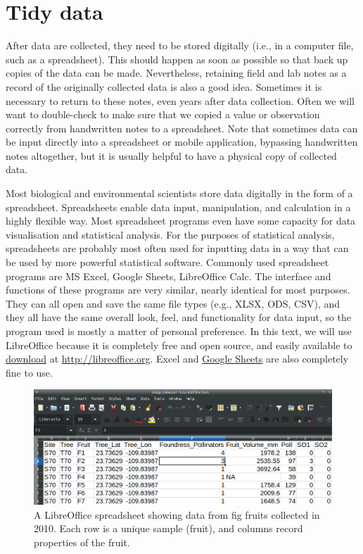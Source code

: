 \documentclass[
]{scrbook}
\begin{document}
\hypertarget{tidy-data}{%
\section{Tidy data}\label{tidy-data}}

After data are collected, they need to be stored digitally (i.e., in a computer file, such as a spreadsheet).
This should happen as soon as possible so that back up copies of the data can be made.
Nevertheless, retaining field and lab notes as a record of the originally collected data is also a good idea.
Sometimes it is necessary to return to these notes, even years after data collection.
Often we will want to double-check to make sure that we copied a value or observation correctly from handwritten notes to a spreadsheet.
Note that sometimes data can be input directly into a spreadsheet or mobile application, bypassing handwritten notes altogether, but it is usually helpful to have a physical copy of collected data.

Most biological and environmental scientists store data digitally in the form of a spreadsheet.
Spreadsheets enable data input, manipulation, and calculation in a highly flexible way.
Most spreadsheet programs even have some capacity for data visualisation and statistical analysis.
For the purposes of statistical analysis, spreadsheets are probably most often used for inputting data in a way that can be used by more powerful statistical software.
Commonly used spreadsheet programs are MS Excel, Google Sheets, LibreOffice Calc.
The interface and functions of these programs are very similar, nearly identical for most purposes.
They can all open and save the same file types (e.g., XLSX, ODS, CSV), and they all have the same overall look, feel, and functionality for data input, so the program used is mostly a matter of personal preference.
In this text, we will use LibreOffice because it is completely free and open source, and easily available to \href{https://www.libreoffice.org/download/download-libreoffice/}{download} at \url{http://libreoffice.org}.
Excel and \href{https://docs.google.com/spreadsheets}{Google Sheets} are also completely fine to use.

\begin{figure}
\includegraphics[width=1\linewidth]{img/wasp_data_spreadsheet} \caption{A LibreOffice spreadsheet showing data from fig fruits collected in 2010. Each row is a unique sample (fruit), and columns record properties of the fruit.}\label{fig:unnamed-chunk-6}
\end{figure}
\end{document}
